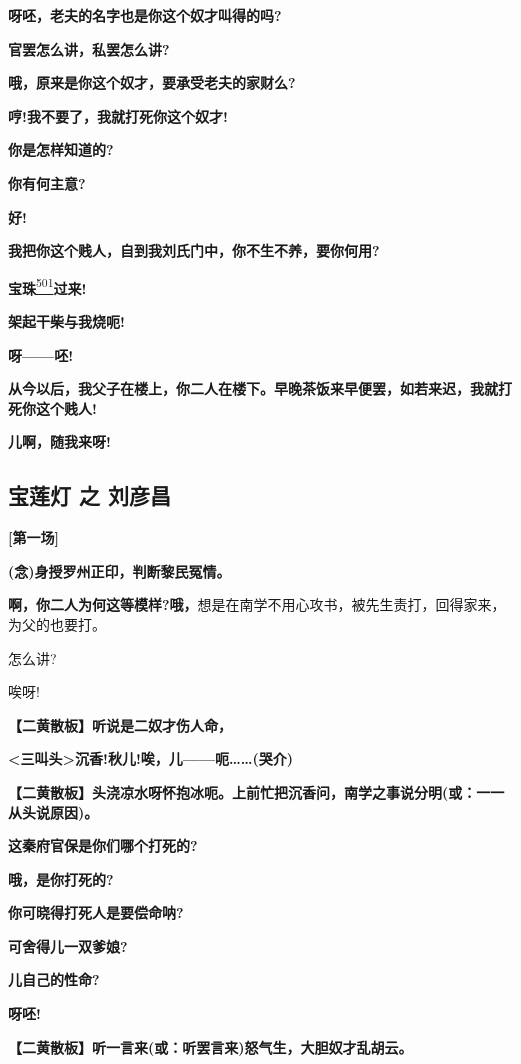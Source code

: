 \textbf{呀呸，老夫的名字也是你这个奴才叫得的吗?}

\textbf{官罢怎么讲，私罢怎么讲?}

\textbf{哦，原来是你这个奴才，要承受老夫的家财么?}

\textbf{哼!我不要了，我就打死你这个奴才!}

\textbf{你是怎样知道的?}

\textbf{你有何主意?}

\textbf{好!}

\textbf{我把你这个贱人，自到我刘氏门中，你不生不养，要你何用?}

\textbf{宝珠}\protect\hyperlink{fn501}{\textsuperscript{501}}\textbf{过来!}

\textbf{架起干柴与我烧呃!}

\textbf{呀------呸!}

\textbf{从今以后，我父子在楼上，你二人在楼下。早晚茶饭来早便罢，如若来迟，我就打死你这个贱人!}

\textbf{儿啊，随我来呀!}

\newpage
\hypertarget{ux5b9dux83b2ux706f-ux4e4b-ux5218ux5f66ux660c}{%
\subsection{宝莲灯 之
刘彦昌}\label{ux5b9dux83b2ux706f-ux4e4b-ux5218ux5f66ux660c}}

\textbf{{[}第一场{]}}

\textbf{(念)身授罗州正印，判断黎民冤情。}

\textbf{啊，你二人为何这等模样?哦，}想是在南学不用心攻书，被先生责打，回得家来，为父的也要打。

怎么讲?

唉呀!

\textbf{【二黄散板】听说是二奴才伤人命，}

\textbf{\textless{}三叫头\textgreater{}沉香!秋儿!唉，儿------呃\ldots{}\ldots{}(哭介)}

\textbf{【二黄散板】头浇凉水呀怀抱冰呃。上前忙把沉香问，南学之事说分明(或：一一从头说原因)。}

\textbf{这秦府官保是你们哪个打死的?}

\textbf{哦，是你打死的?}

\textbf{你可晓得打死人是要偿命呐?}

\textbf{可舍得儿一双爹娘?}

\textbf{儿自己的性命?}

\textbf{呀呸!}

\textbf{【二黄散板】听一言来(或：听罢言来)怒气生，大胆奴才乱胡云。}

